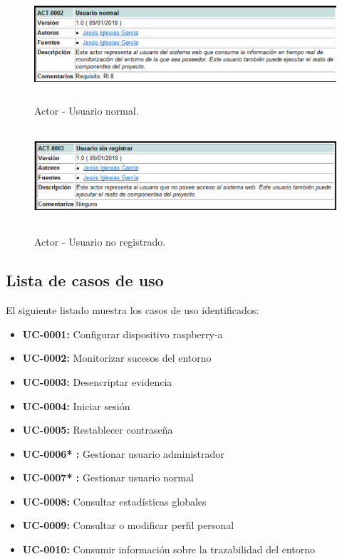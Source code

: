 \documentclass[12pt,a4paper, twoside]{report}
\begin{document}
	\newpage
	
	\begin{figure}[!ht]   
		\caption{Actor - Usuario normal.} 
		\begin{center} 
	 		\includegraphics[width=14cm,height=3.5cm]{Images/analysis/actors/actor_normal} \\
			\label{fig:actor_02} 
		\end{center}  
	\end{figure} 
	
	\begin{figure}[!ht]   
		\caption{Actor - Usuario no registrado.} 
		\begin{center} 
	 		\includegraphics[width=14cm,height=3.5cm]{Images/analysis/actors/actor_noregistrado} \\
			\label{fig:actor_03} 
		\end{center}  
	\end{figure} 
	
	\newpage
	
	\subsection{Lista de casos de uso} \label{UClist}
	
	El siguiente listado muestra los casos de uso identificados:
	
	\begin{itemize}
		\item \textbf{UC-0001:} Configurar dispositivo \gls{raspberry-a}
		\item \textbf{UC-0002:} Monitorizar sucesos del entorno
		\item \textbf{UC-0003:} Desencriptar evidencia
		\item \textbf{UC-0004:} Iniciar sesión
		\item \textbf{UC-0005:} Restablecer contraseña 
		\item \textbf{UC-0006{\color{black!40!blue}*} :} Gestionar usuario administrador
		\item \textbf{UC-0007{\color{black!40!blue}*} :} Gestionar usuario normal
		\item \textbf{UC-0008:} Consultar estadísticas globales
		\item \textbf{UC-0009:} Consultar o modificar perfil personal
		\item \textbf{UC-0010:} Consumir información sobre la trazabilidad del entorno
	\end{itemize}
	
\end{document}
